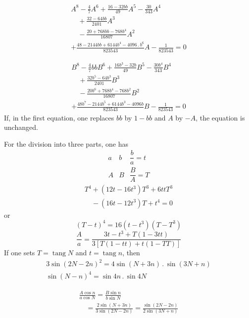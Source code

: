 \[
\begin{gathered}
A^8-\tfrac47A^6+\frac{16-32bb}{49}A^5-\frac{30}{343}A^4
\\[7pt]\quad{}+\frac{32-64bb}{2401}A^3
\\[7pt]\quad{}-\frac{20+768bb-768b^4}{16807}A^2\\[7pt]
+\frac{48-2144bb+6144b^4-4096\mathbin{.}b^6}{823543}A
-\frac1{823543}=0
\end{gathered}
\]

\[
\begin{gathered}
B^8-\tfrac47bbB^6+\frac{16b^3-32b}{49}B^5-\frac{30b^4}{343}B^4
\\[7pt]\quad{}+\frac{32b^5-64b^3}{2401}B^3
\\[7pt]\quad{}-\frac{20b^6+768b^4-768b^2}{16807}B^2\\[7pt]
+\frac{48b^7-2144b^5+6144b^3-4096b}{823543}B
-\frac1{823543}=0
\end{gathered}
\]
If, in the first equation, one replaces $bb$ by $1-bb$ and $A$ by $-A$, the equation is unchanged.


For the division into three parts, one has
\[
\begin{array}{ccc}
a&b&\dfrac ba=t\\[5pt]
A&B&\dfrac BA=T
\end{array}
\]
\[
\begin{gathered}T^4+(12t-16t^3)T^3+6ttT^3\\[7pt]\quad{}-(16t-12t^3)T+t^4=0\end{gathered}
\]
or
\[
(T-t)^4=16(t-t^3)(T-T^3)
\]
\[
\frac Aa=\frac{3t-t^3+T(1-3tt)}{3[T(1-tt)+t(1-TT)]}
\]
If one sets $T=\operatorname{tang}N$ and $t=\operatorname{tang}n$, then
\[
\begin{gathered}
3\sin(2N-2n)^2=4\sin(N+3n)\mathbin{.}\sin(3N+n)\\[7pt]
\sin(N-n)^4=\sin4n\mathbin{.}\sin4N
\end{gathered}
\]

\[
\begin{gathered}\frac{A\cos n}{a\cos N}=\frac{B\sin n}{b\sin N}
\\[7pt]\quad{}=\frac{2\sin(N+3n)}{3\sin(2N-2n)}
=\frac{\sin(2N-2n)}{2\sin(3N+n)}\end{gathered}
\]

\clearpage
\endgroup
